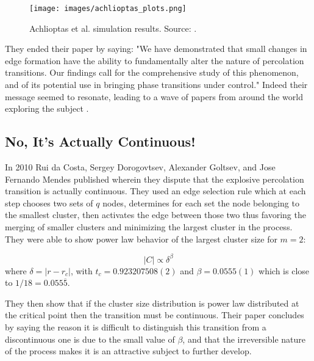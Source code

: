 \begin{figure}[H]
	\centering
	\texttt{[image: images/achlioptas\_plots.png]}
	\caption{Achlioptas et al. simulation results. Source: \cite{Achlioptas_1}.}
	\label{fig:achlioptas_plots}
\end{figure}

They ended their paper by saying: "We have demonstrated that small changes in edge formation have the ability to fundamentally alter the nature of percolation transitions. Our findings call for the comprehensive study of this phenomenon, and of its potential use in bringing phase transitions under control."
Indeed their message seemed to resonate, leading to a wave of papers from around the world exploring the subject \cite{Ziff_1, Cho_1, Radicchi_1, Friedman_1, Ziff_2, Radicchi_2, D_Souza_1, da_Costa_1, Rozenfeld_1, Araujo_1, Moreira_1, Cho_2, Cho_3, Nagler_1, Manna_1, Grassberger_1, Lee_1, Riordan_1, Hooyberghs_1, Nagler_2, Chen_1, Panagiotou_1, Pan_1, Cho_4, Gomez_1, Tian_1, Riordan_2, Riordan_3, Boettcher_1, Chen_2, Angst_1, Bizhani_1, Cho_5, Schroeder_1, Chen_3, Chen_4, Squires_1, Do_1, Chen_5, Bastas_1, Cho_6, da_Costa_2, Riordan_4, Guan_1, da_Costa_5, da_Costa_3, da_Costa_4, D_Souza_2, Hayasaka_1, Clusella_1, Boccaletti_1, Gedik_1, Rahman_1, Waagen_1, Zhu_1, Sabbir_1, Trevelyan_1, Sabbir_1}.



\subsection{No, It's Actually Continuous!}
\label{subsec:no_its_actually_continuous}
In 2010 Rui da Costa, Sergey Dorogovtsev, Alexander Goltsev, and Jose Fernando Mendes published \cite{da_Costa_1} wherein they dispute that the explosive percolation transition is actually continuous.
They used an edge selection rule which at each step chooses two sets of $q$ nodes, determines for each set the node belonging to the smallest cluster, then activates the edge between those two thus favoring the merging of smaller clusters and minimizing the largest cluster in the process.
They were able to show power law behavior of the largest cluster size for $m = 2$:

\begin{equation}
	|C| \propto \delta^\beta
\end{equation}
where $\delta = |r - r_c|$, with $t_c = 0.923207508(2)$ and $\beta = 0.0555(1)$ which is close to $1/18 = 0.055\overline{5}$.

They then show that if the cluster size distribution is power law distributed at the critical point then the transition must be continuous.
Their paper concludes by saying the reason it is difficult to distinguish this transition from a discontinuous one is due to the small value of $\beta$, and that the irreversible nature of the process makes it is an attractive subject to further develop.



